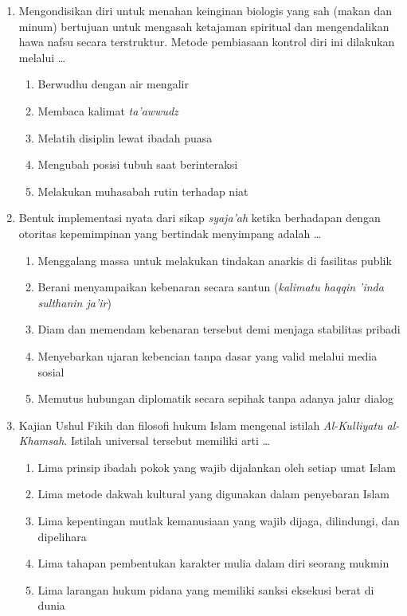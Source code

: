 \documentclass[12pt,a4paper]{article}
\begin{document}
\begin{enumerate}[leftmargin=*]
\item Mengondisikan diri untuk menahan keinginan biologis yang sah (makan dan minum) bertujuan untuk mengasah ketajaman spiritual dan mengendalikan hawa nafsu secara terstruktur. Metode pembiasaan kontrol diri ini dilakukan melalui \dots
    \begin{enumerate}[label=\alph*.]
        \item Berwudhu dengan air mengalir
        \item Membaca kalimat \textit{ta'awwudz}
        \item Melatih disiplin lewat ibadah puasa
        \item Mengubah posisi tubuh saat berinteraksi
        \item Melakukan muhasabah rutin terhadap niat
    \end{enumerate}

\item Bentuk implementasi nyata dari sikap \textit{syaja'ah} ketika berhadapan dengan otoritas kepemimpinan yang bertindak menyimpang adalah \dots
    \begin{enumerate}[label=\alph*.]
        \item Menggalang massa untuk melakukan tindakan anarkis di fasilitas publik
        \item Berani menyampaikan kebenaran secara santun (\textit{kalimatu haqqin 'inda sulthanin ja'ir})
        \item Diam dan memendam kebenaran tersebut demi menjaga stabilitas pribadi
        \item Menyebarkan ujaran kebencian tanpa dasar yang valid melalui media sosial
        \item Memutus hubungan diplomatik secara sepihak tanpa adanya jalur dialog
    \end{enumerate}


\item Kajian Ushul Fikih dan filosofi hukum Islam mengenal istilah \textit{Al-Kulliyatu al-Khamsah}. Istilah universal tersebut memiliki arti \dots
    \begin{enumerate}[label=\alph*.]
        \item Lima prinsip ibadah pokok yang wajib dijalankan oleh setiap umat Islam
        \item Lima metode dakwah kultural yang digunakan dalam penyebaran Islam
        \item Lima kepentingan mutlak kemanusiaan yang wajib dijaga, dilindungi, dan dipelihara
        \item Lima tahapan pembentukan karakter mulia dalam diri seorang mukmin
        \item Lima larangan hukum pidana yang memiliki sanksi eksekusi berat di dunia
    \end{enumerate}


\end{enumerate}
\end{document}
